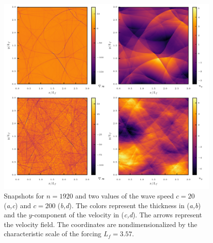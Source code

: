 \begin{figure}
\centerline{\includegraphics[width=5.20in]{../Pyfig/fig_phys_fields_wave}}
\caption{
Snapshots for $n = 1920$ and two values of the wave speed
$c= 20$ (\textit{a,c}) and $c= 200$ (\textit{b,d}).
The colors represent the thickness in (\textit{a,b}) and
the $y$-component of the velocity in (\textit{c,d}).
The arrows represent the velocity field.
%
The coordinates are nondimensionalized by the characteristic scale of
the forcing $L_f = 3.57$.  }
\label{fig_phys}
\end{figure}

